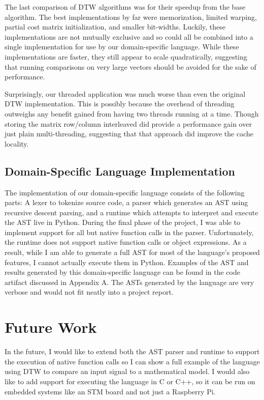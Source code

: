 \documentclass[sigconf,authordraft]{acmart}
\begin{document}
The last comparison of DTW algorithms was for their speedup from the base algorithm. The best implementations by far were memorization, limited warping, partial cost matrix initialization, and smaller bit-widths. Luckily, these implementations are not mutually exclusive and so could all be combined into a single implementation for use by our domain-specific language. While these implementations are faster, they still appear to scale quadratically, suggesting that running comparisons on very large vectors should be avoided for the sake of performance.

Surprisingly, our threaded application was much worse than even the original DTW implementation. This is possibly because the overhead of threading outweighs any benefit gained from having two threads running at a time. Though storing the matrix row/column interleaved did provide a performance gain over just plain multi-threading, suggesting that that approach did improve the cache locality.

\subsection{Domain-Specific Language Implementation}
The implementation of our domain-specific language consists of the following parts: A lexer to tokenize source code, a parser which generates an AST using recursive descent parsing, and a runtime which attempts to interpret and execute the AST live in Python. During the final phase of the project, I was able to implement support for all but native function calls in the parser. Unfortunately, the runtime does not support native function calls or object expressions. As a result, while I am able to generate a full AST for most of the language's proposed features, I cannot actually execute them in Python. Examples of the AST and results generated by this domain-specific language can be found in the code artifact discussed in Appendix A. The ASTs generated by the language are very verbose and would not fit neatly into a project report. 

\section{Future Work}
In the future, I would like to extend both the AST parser and runtime to support the execution of native function calls so I can show a full example of the language using DTW to compare an input signal to a mathematical model. I would also like to add support for executing the language in C or C++, so it can be run on embedded systems like an STM board and not just a Raspberry Pi.
\end{document}
